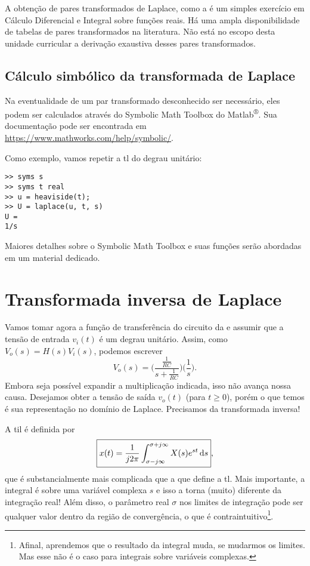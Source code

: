 A obtenção de pares transformados de Laplace, como a  é um simples exercício em Cálculo Diferencial e Integral sobre funções reais. Há uma ampla disponibilidade de tabelas de pares transformados na literatura. Não está no escopo desta unidade curricular a derivação exaustiva desses pares transformados.

\subsection{Cálculo simbólico da transformada de Laplace}

Na eventualidade de um par transformado desconhecido ser necessário, eles podem ser calculados através do Symbolic Math Toolbox do Matlab\textsuperscript{®}. Sua documentação pode ser encontrada em \url{https://www.mathworks.com/help/symbolic/}.

Como exemplo, vamos repetir a \ac{tl} do degrau unitário:
\begin{lstlisting}
>> syms s
>> syms t real
>> u = heaviside(t);
>> U = laplace(u, t, s)
U = 
1/s
\end{lstlisting}

Maiores detalhes sobre o Symbolic Math Toolbox e suas funções serão abordadas em um material dedicado.

\section{Transformada inversa de Laplace}

Vamos tomar agora a função de transferência do circuito da  e assumir que a tensão de entrada $v_i(t)$ é um degrau unitário. Assim, como $V_o(s)=H(s)V_i(s)$, podemos escrever
\begin{equation*}
	V_o(s)=\Big(\frac{\frac{1}{RC}}{s+\frac{1}{RC}}\Big)\Big(\frac{1}{s}\Big).
\end{equation*}
Embora seja possível expandir a multiplicação indicada, isso não avança nossa causa. Desejamos obter a tensão de saída $v_o(t)$ (para $t\geq0$), porém o que temos é sua representação no domínio de Laplace. Precisamos da transformada inversa!

A \ac{til} é definida por
\begin{equation}\label{eq:til}
	\boxed{x(t)=\frac{1}{j2\pi}\inte{X(s)e^{st}}{s}{\sigma-j\infty}{\sigma+j\infty}},
\end{equation}
que é substancialmente mais complicada que a  que define a \ac{tl}. Mais importante, a integral é sobre uma variável complexa $s$ e isso a torna (muito) diferente da integração real! Além disso, o parâmetro real $\sigma$ nos limites de integração pode ser qualquer valor dentro da região de convergência, o que é contraintuitivo\footnote{Afinal, aprendemos que o resultado da integral muda, se mudarmos os limites. Mas esse não é o caso para integrais sobre variáveis complexas.}.

